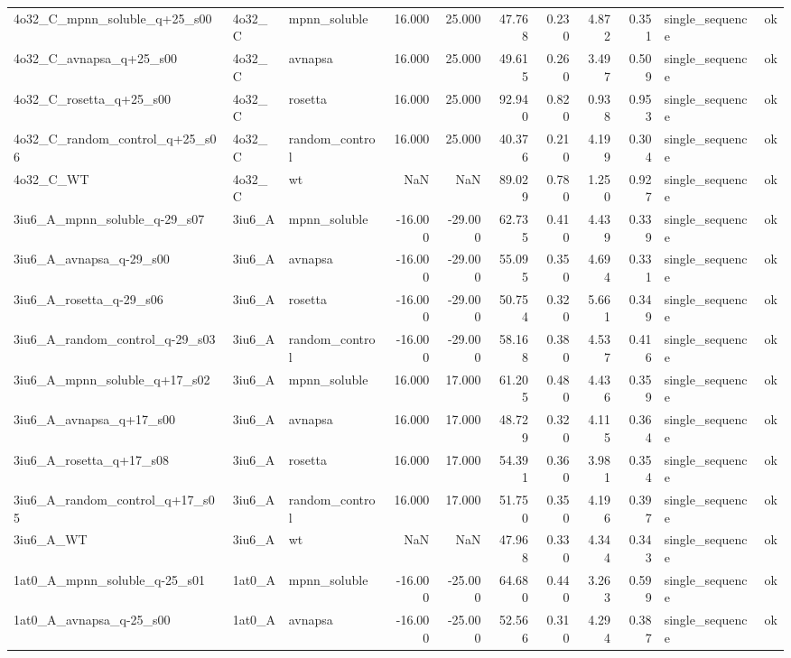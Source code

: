 \begin{table}
\begin{tabular}{lllrrrrrrll}
4o32\_C\_mpnn\_soluble\_q+25\_s00 & 4o32\_C & mpnn\_soluble & 16.000 & 25.000 & 47.768 & 0.230 & 4.872 & 0.351 & single\_sequence & ok \\
4o32\_C\_avnapsa\_q+25\_s00 & 4o32\_C & avnapsa & 16.000 & 25.000 & 49.615 & 0.260 & 3.497 & 0.509 & single\_sequence & ok \\
4o32\_C\_rosetta\_q+25\_s00 & 4o32\_C & rosetta & 16.000 & 25.000 & 92.940 & 0.820 & 0.938 & 0.953 & single\_sequence & ok \\
4o32\_C\_random\_control\_q+25\_s06 & 4o32\_C & random\_control & 16.000 & 25.000 & 40.376 & 0.210 & 4.199 & 0.304 & single\_sequence & ok \\
4o32\_C\_WT & 4o32\_C & wt & NaN & NaN & 89.029 & 0.780 & 1.250 & 0.927 & single\_sequence & ok \\
3iu6\_A\_mpnn\_soluble\_q-29\_s07 & 3iu6\_A & mpnn\_soluble & -16.000 & -29.000 & 62.735 & 0.410 & 4.439 & 0.339 & single\_sequence & ok \\
3iu6\_A\_avnapsa\_q-29\_s00 & 3iu6\_A & avnapsa & -16.000 & -29.000 & 55.095 & 0.350 & 4.694 & 0.331 & single\_sequence & ok \\
3iu6\_A\_rosetta\_q-29\_s06 & 3iu6\_A & rosetta & -16.000 & -29.000 & 50.754 & 0.320 & 5.661 & 0.349 & single\_sequence & ok \\
3iu6\_A\_random\_control\_q-29\_s03 & 3iu6\_A & random\_control & -16.000 & -29.000 & 58.168 & 0.380 & 4.537 & 0.416 & single\_sequence & ok \\
3iu6\_A\_mpnn\_soluble\_q+17\_s02 & 3iu6\_A & mpnn\_soluble & 16.000 & 17.000 & 61.205 & 0.480 & 4.436 & 0.359 & single\_sequence & ok \\
3iu6\_A\_avnapsa\_q+17\_s00 & 3iu6\_A & avnapsa & 16.000 & 17.000 & 48.729 & 0.320 & 4.115 & 0.364 & single\_sequence & ok \\
3iu6\_A\_rosetta\_q+17\_s08 & 3iu6\_A & rosetta & 16.000 & 17.000 & 54.391 & 0.360 & 3.981 & 0.354 & single\_sequence & ok \\
3iu6\_A\_random\_control\_q+17\_s05 & 3iu6\_A & random\_control & 16.000 & 17.000 & 51.750 & 0.350 & 4.196 & 0.397 & single\_sequence & ok \\
3iu6\_A\_WT & 3iu6\_A & wt & NaN & NaN & 47.968 & 0.330 & 4.344 & 0.343 & single\_sequence & ok \\
1at0\_A\_mpnn\_soluble\_q-25\_s01 & 1at0\_A & mpnn\_soluble & -16.000 & -25.000 & 64.680 & 0.440 & 3.263 & 0.599 & single\_sequence & ok \\
1at0\_A\_avnapsa\_q-25\_s00 & 1at0\_A & avnapsa & -16.000 & -25.000 & 52.566 & 0.310 & 4.294 & 0.387 & single\_sequence & ok \\

\end{tabular}
\end{table}
